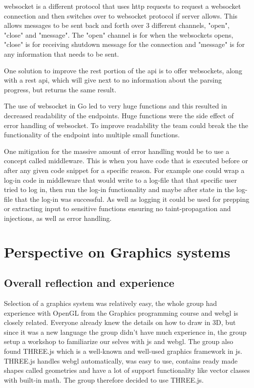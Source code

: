 \Gls{websocket} is a different protocol that uses \gls{http} requests to request a \Gls{websocket} connection and then switches over to \Gls{websocket} protocol if server allows. This allows messages to be sent back and forth over 3 different channels, "open", "close" and "message". The "open" channel is for when the \Glspl{websocket} opens, "close" is for receiving shutdown message for the connection and "message" is for any information that needs to be sent. 

One solution to improve the \gls{rest} portion of the \gls{api} is to offer \Glspl{websocket}, along with a \gls{rest} \gls{api}, which will give next to no information about the parsing progress, but returns the same result.

The use of \gls{websocket} in Go led to very huge functions and this resulted in decreased readability of the endpoints. Huge functions were the side effect of error handling of \gls{websocket}. To improve readability the team could break the the functionality of the endpoint into multiple small functions.

One mitigation for the massive amount of error handling would be to use a concept called middleware. This is when you have code that is executed before or after any given code snippet for a specific reason. For example one could wrap a log-in code in middleware that would write to a log-file that that specific user tried to log in, then run the log-in functionality and maybe after state in the log-file that the log-in was successful. As well as logging it could be used for prepping or extracting input to sensitive functions ensuring no taint-propagation and injections, as well as error handling.

\section{Perspective on Graphics systems}
\subsection{Overall reflection and experience}
Selection of a graphics system was relatively easy, the whole group had experience with OpenGL from the Graphics programming course and \gls{webgl} is closely related. Everyone already knew the details on how to draw in 3D, but since it was a new language the group didn't have much experience in, the group setup a workshop to familiarize our selves with \Gls{js} and \gls{webgl}. The group also found THREE.js which is a well-known and well-used graphics framework in \Gls{js}. THREE.js handles \gls{webgl} automatically, was easy to use, contains ready made shapes called geometries and have a lot of support functionality like vector classes with built-in math. The group therefore decided to use THREE.js.

